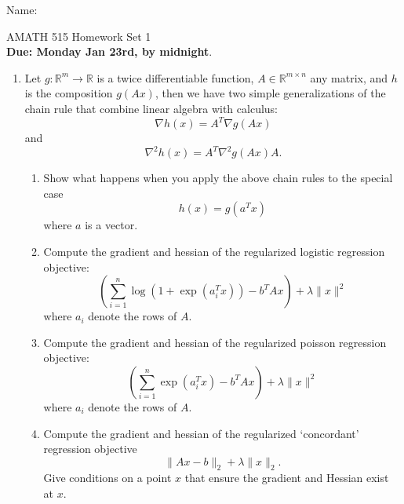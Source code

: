 \documentclass[11pt]{amsart}
\begin{document}
{\Large Name:}  \\
\begin{center}
\Large AMATH 515 \hskip 2in Homework Set 1\\
{\bf Due:  Monday Jan 23rd, by midnight}. 
\end{center}
\bigskip
\begin{enumerate}

%
%
%

\item Let $g:\mathbb{R}^m \rightarrow \mathbb{R}$ is a twice differentiable function,  $A \in \mathbb{R}^{m\times n}$ any matrix, 
and $h$ is the composition $g(Ax)$, then we have two simple generalizations of the chain rule that combine linear algebra with calculus:
\[
\nabla h(x) = A^T \nabla g(Ax) 
\]
and 
\[
\nabla^2 h(x) = A^T \nabla^2 g(Ax) A. 
\]
\begin{enumerate}
\item Show what happens when you apply the above chain rules to the special case 
\[
h(x) = g(a^Tx)
\]
where $a$ is a vector. 

\item Compute the gradient and hessian of the regularized logistic regression objective: 
\[
\left(\sum_{i=1}^n \log(1+\exp(a_i^Tx))- b^TAx\right) + \lambda \|x\|^2
\]
where $a_i$ denote the rows of $A$.

\item Compute the gradient and hessian of the regularized poisson regression objective: 
\[
\left(\sum_{i=1}^n \exp(a_i^Tx)- b^TAx\right) + \lambda \|x\|^2
\]
where $a_i$ denote the rows of $A$.

\item Compute the gradient and hessian of the regularized `concordant' regression objective
\[
\|Ax-b\|_2 + \lambda \|x\|_2.
\]
Give conditions on a point $x$ that ensure the gradient and Hessian exist at $x$. 



\end{enumerate}
\end{enumerate}
\end{document}
